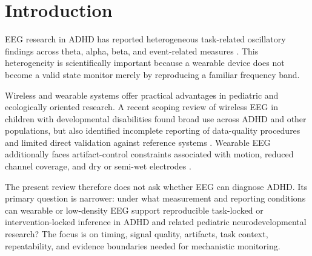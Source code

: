 \section{Introduction}

EEG research in ADHD has reported heterogeneous task-related oscillatory findings across theta, alpha, beta, and event-related measures \parencite{michelini2022eventoscillations,arpaia2022eegfeatures}. This heterogeneity is scientifically important because a wearable device does not become a valid state monitor merely by reproducing a familiar frequency band.

Wireless and wearable systems offer practical advantages in pediatric and ecologically oriented research. A recent scoping review of wireless EEG in children with developmental disabilities found broad use across ADHD and other populations, but also identified incomplete reporting of data-quality procedures and limited direct validation against reference systems \parencite{park2026wirelesseeg}. Wearable EEG additionally faces artifact-control constraints associated with motion, reduced channel coverage, and dry or semi-wet electrodes \parencite{wearableartifacts2025}.

The present review therefore does not ask whether EEG can diagnose ADHD. Its primary question is narrower: under what measurement and reporting conditions can wearable or low-density EEG support reproducible task-locked or intervention-locked inference in ADHD and related pediatric neurodevelopmental research? The focus is on timing, signal quality, artifacts, task context, repeatability, and evidence boundaries needed for mechanistic monitoring.
